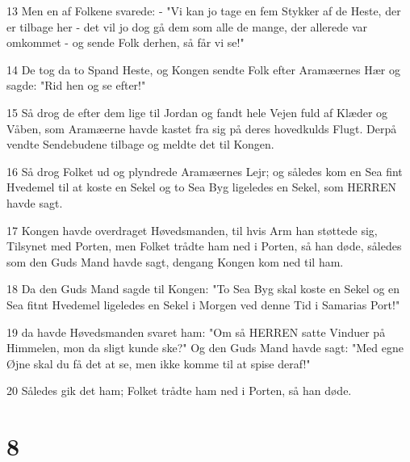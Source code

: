\par 13 Men en af Folkene svarede: - "Vi kan jo tage en fem Stykker af de Heste, der er tilbage her - det vil jo dog gå dem som alle de mange, der allerede var omkommet - og sende Folk derhen, så får vi se!"
\par 14 De tog da to Spand Heste, og Kongen sendte Folk efter Aramæernes Hær og sagde: "Rid hen og se efter!"
\par 15 Så drog de efter dem lige til Jordan og fandt hele Vejen fuld af Klæder og Våben, som Aramæerne havde kastet fra sig på deres hovedkulds Flugt. Derpå vendte Sendebudene tilbage og meldte det til Kongen.
\par 16 Så drog Folket ud og plyndrede Aramæernes Lejr; og således kom en Sea fint Hvedemel til at koste en Sekel og to Sea Byg ligeledes en Sekel, som HERREN havde sagt.
\par 17 Kongen havde overdraget Høvedsmanden, til hvis Arm han støttede sig, Tilsynet med Porten, men Folket trådte ham ned i Porten, så han døde, således som den Guds Mand havde sagt, dengang Kongen kom ned til ham.
\par 18 Da den Guds Mand sagde til Kongen: "To Sea Byg skal koste en Sekel og en Sea fitnt Hvedemel ligeledes en Sekel i Morgen ved denne Tid i Samarias Port!"
\par 19 da havde Høvedsmanden svaret ham: "Om så HERREN satte Vinduer på Himmelen, mon da sligt kunde ske?" Og den Guds Mand havde sagt: "Med egne Øjne skal du få det at se, men ikke komme til at spise deraf!"
\par 20 Således gik det ham; Folket trådte ham ned i Porten, så han døde.

\chapter{8}

